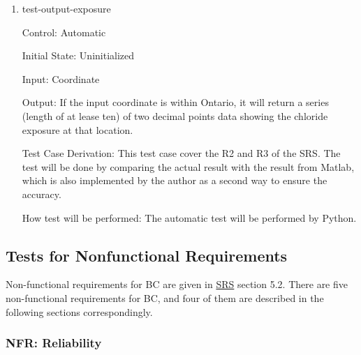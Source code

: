 \documentclass[12pt, titlepage]{article}
\begin{document}
\begin{enumerate}

\item{test-output-exposure\\}

Control: Automatic
					
Initial State: Uninitialized
					
Input: Coordinate
					
Output: If the input coordinate is within Ontario, it will return a series (length of at lease ten) of two decimal points data showing the chloride exposure at that location.

Test Case Derivation: This test case cover the R2 and R3 of the SRS. The test will be done by comparing the actual result with the result from Matlab, which is also implemented by the author as a second way to ensure the accuracy.

					
How test will be performed: The automatic test will be performed by Python.

\end{enumerate}


\subsection{Tests for Nonfunctional Requirements}\label{TNR}

Non-functional requirements for BC are given in \href{https://github.com/CynthiaLiu0805/BridgeCorrosion/blob/main/docs/SRS/SRS.pdf}{SRS} section 5.2. There are five non-functional requirements for BC, and four of them are described in the following sections correspondingly.



\subsubsection{NFR: Reliability}\label{t_reliability}
		
\end{document}
